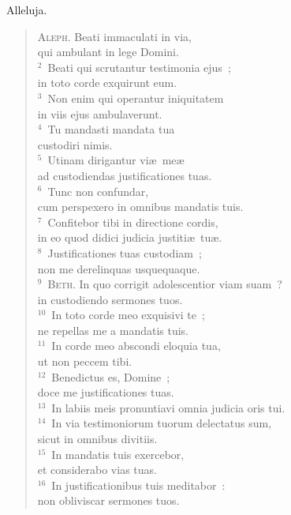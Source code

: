\lettrine[lines=3,image=true,loversize=0.05,lraise=-0.03]{A}{}lleluja. \begin{flushleft}\begin{verse}\vspace{6pt}\textsc{Aleph.} Beati immaculati in via,\\ qui ambulant in lege Domini.\\
${}^{2}$~Beati qui scrutantur testimonia ejus~;\\ in toto corde exquirunt eum.\\
${}^{3}$~Non enim qui operantur iniquitatem\\ in viis ejus ambulaverunt.\\
${}^{4}$~Tu mandasti mandata tua\\ custodiri nimis.\\
${}^{5}$~Utinam dirigantur vi\ae\ me\ae \\ ad custodiendas justificationes tuas.\\
${}^{6}$~Tunc non confundar,\\ cum perspexero in omnibus mandatis tuis.\\
${}^{7}$~Confitebor tibi in directione cordis,\\ in eo quod didici judicia justiti\ae\ tu\ae .\\
${}^{8}$~Justificationes tuas custodiam~;\\ non me derelinquas usquequaque.\\
${}^{9}$~\textsc{Beth.} In quo corrigit adolescentior viam suam~?\\ in custodiendo sermones tuos.\\
${}^{10}$~In toto corde meo exquisivi te~;\\ ne repellas me a mandatis tuis.\\
${}^{11}$~In corde meo abscondi eloquia tua,\\ ut non peccem tibi.\\
${}^{12}$~Benedictus es, Domine~;\\ doce me justificationes tuas.\\
${}^{13}$~In labiis meis pronuntiavi omnia judicia oris tui.\\
${}^{14}$~In via testimoniorum tuorum delectatus sum,\\ sicut in omnibus divitiis.\\
${}^{15}$~In mandatis tuis exercebor,\\ et considerabo vias tuas.\\
${}^{16}$~In justificationibus tuis meditabor~:\\ non obliviscar sermones tuos.\\

\end{verse}
\end{flushleft}

